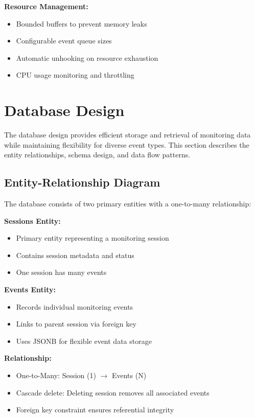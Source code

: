 \textbf{Resource Management:}
\begin{itemize}
    \item Bounded buffers to prevent memory leaks
    \item Configurable event queue sizes
    \item Automatic unhooking on resource exhaustion
    \item CPU usage monitoring and throttling
\end{itemize}

\section{Database Design}

The database design provides efficient storage and retrieval of monitoring data while maintaining flexibility for diverse event types. This section describes the entity relationships, schema design, and data flow patterns.

\subsection{Entity-Relationship Diagram}

The database consists of two primary entities with a one-to-many relationship:

\textbf{Sessions Entity:}
\begin{itemize}
    \item Primary entity representing a monitoring session
    \item Contains session metadata and status
    \item One session has many events
\end{itemize}

\textbf{Events Entity:}
\begin{itemize}
    \item Records individual monitoring events
    \item Links to parent session via foreign key
    \item Uses JSONB for flexible event data storage
\end{itemize}

\textbf{Relationship:}
\begin{itemize}
    \item One-to-Many: Session (1) $\rightarrow$ Events (N)
    \item Cascade delete: Deleting session removes all associated events
    \item Foreign key constraint ensures referential integrity
\end{itemize}

